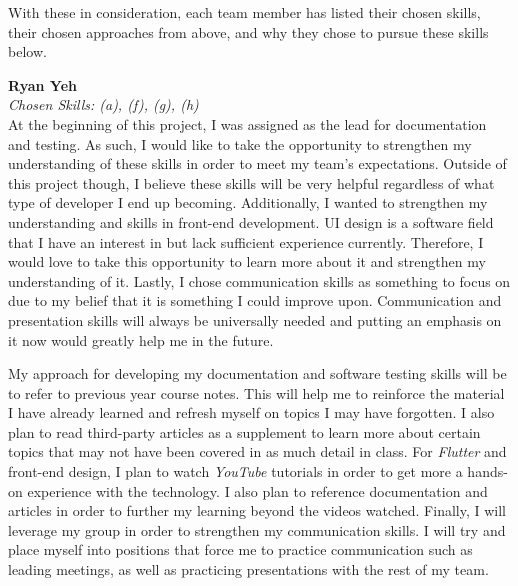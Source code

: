 \documentclass[12pt]{article}
\begin{document}
\begin{enumerate}
  With these in consideration, each team member has listed their chosen skills, their chosen approaches from above,
  and why they chose to pursue these skills below.

  \textbf{Ryan Yeh}\\
  \textit{Chosen Skills: (a), (f), (g), (h)} \\
  At the beginning of this project, I was assigned as the lead for documentation and testing. As such,
  I would like to take the opportunity to strengthen my understanding of these skills in order to meet my team's
  expectations. Outside of this project though, I believe these skills will be very helpful regardless of what type
  of developer I end up becoming. Additionally, I wanted to strengthen my understanding and skills in front-end
  development. UI design is a software field that I have an interest in but lack sufficient experience currently.
  Therefore, I would love to take this opportunity to learn more about it and strengthen my understanding of it. Lastly,
  I chose communication skills as something to focus on due to my belief that it is something I could improve upon.
  Communication and presentation skills will always be universally needed and putting an emphasis on it now would greatly
  help me in the future. \par
  My approach for developing my documentation and software testing skills will be to refer to previous year course notes.
  This will help me to reinforce the material I have already learned and refresh myself on topics I may have forgotten.
  I also plan to read third-party articles as a supplement to learn more about certain
  topics that may not have been covered in as much detail in class. For \textit{Flutter} and front-end design,
  I plan to watch \textit{YouTube} tutorials in order to get more a hands-on experience with the technology. I also
  plan to reference documentation and articles in order to further my learning beyond the videos watched. Finally,
  I will leverage my group in order to strengthen my communication skills. I will try and place myself into positions
  that force me to practice communication such as leading meetings, as well as practicing presentations with the
  rest of my team.


\end{enumerate}
\end{document}
